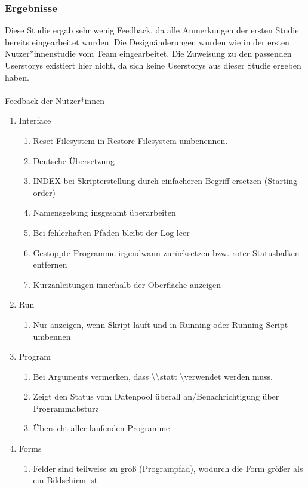 \documentclass[accentcolor=tud9c,12pt,paper=a4]{tudreport}
\begin{document}
	\subsubsection{Ergebnisse}
	Diese Studie ergab sehr wenig Feedback, da alle Anmerkungen der ersten Studie bereits
	eingearbeitet wurden. Die Designänderungen wurden wie in der ersten Nutzer*innenstudie
	vom Team eingearbeitet. Die Zuweisung zu den passenden Userstorys existiert hier nicht,
	da sich keine Userstorys aus dieser Studie ergeben haben.
	\\\\
	{\large Feedback der Nutzer*innen\\}
	\begin{enumerate}
	\item Interface
	\begin{enumerate}
		\item Reset Filesystem in Restore Filesystem umbenennen.
		\item Deutsche Übersetzung
		\item INDEX bei Skripterstellung durch einfacheren Begriff ersetzen (Starting order)
		\item Namensgebung insgesamt überarbeiten
		\item Bei fehlerhaften Pfaden bleibt der Log leer
		\item Gestoppte Programme irgendwann zurücksetzen bzw. roter Statusbalken entfernen
		\item Kurzanleitungen innerhalb der Oberfläche anzeigen
	\end{enumerate}
	\item Run
	\begin{enumerate}
		\item Nur anzeigen, wenn Skript läuft und in Running oder Running Script umbennen
	\end{enumerate}
	\item Program
	\begin{enumerate}
		\item Bei Arguments vermerken, dass \textbackslash\textbackslash statt \textbackslash verwendet werden muss.
		\item Zeigt den Status vom Datenpool überall an/Benachrichtigung über Programmabsturz
		\item Übersicht aller laufenden Programme
	\end{enumerate}
	\item Forms
	\begin{enumerate}
			\item Felder sind teilweise zu groß (Programpfad), wodurch die Form größer als ein Bildschirm ist
	\end{enumerate}
	\end{enumerate}
\end{document}
